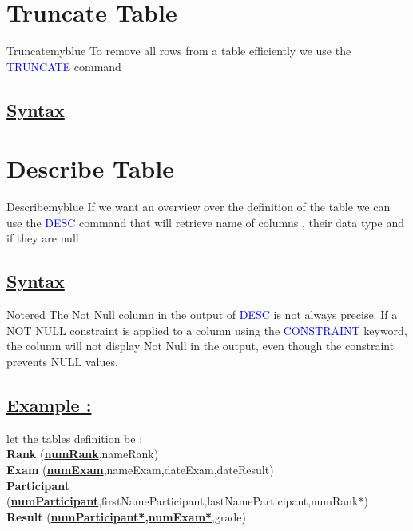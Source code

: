 

\vspace{0.35cm}
\section{Truncate Table}
\begin{prettyBox}{Truncate}{myblue}
    To remove all rows from a table efficiently we use the \textcolor{blue}{TRUNCATE} command
\end{prettyBox}

\vspace{0.15cm}
\subsection*{\underline{Syntax}}



\vspace{0.35cm}
\section{Describe Table}
\begin{prettyBox}{Describe}{myblue}
If we want an overview over the definition of the table we can use the 
\textcolor{blue}{DESC} command that will retrieve name of columns , their data type
and if they are null 
\end{prettyBox}

\vspace{0.15cm}
\subsection*{\underline{Syntax}}



\vspace{0.25cm}


\begin{prettyBox}{Note}{red}
The Not Null column in the output of \textcolor{blue}{DESC} is not always precise. 
If a NOT NULL constraint is applied to a column using the \textcolor{blue}{CONSTRAINT} keyword, 
the column will not display Not Null in the output, even though the constraint prevents NULL values.
\end{prettyBox}

\newpage

\subsection*{\underline{Example :}}
let the tables definition be :\\[0.2cm]
\textbf{Rank} (\underline{\textbf{numRank}},nameRank)\\[0.1cm]
\textbf{Exam} (\underline{\textbf{numExam}},nameExam,dateExam,dateResult)\\[0.1cm]
\textbf{Participant} (\underline{\textbf{numParticipant}},firstNameParticipant,lastNameParticipant,numRank*)\\[0.1cm]
\textbf{Result} (\underline{\textbf{numParticipant*,numExam*}},grade)

